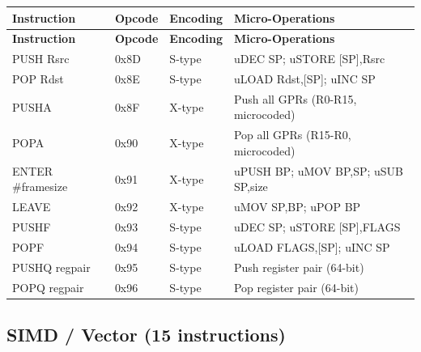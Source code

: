 \documentclass[12pt]{article}
\begin{document}
\begin{longtable}{@{}L{2.8cm}L{1.5cm}L{1.7cm}L{4.5cm}@{}}
\toprule
\textbf{Instruction} & \textbf{Opcode} & \textbf{Encoding} & \textbf{Micro-Operations} \\ \midrule
\endfirsthead
\toprule
\textbf{Instruction} & \textbf{Opcode} & \textbf{Encoding} & \textbf{Micro-Operations} \\ \midrule
\endhead
PUSH Rsrc & 0x8D & S-type & uDEC SP; uSTORE [SP],Rsrc \\
POP Rdst & 0x8E & S-type & uLOAD Rdst,[SP]; uINC SP \\
PUSHA & 0x8F & X-type & Push all GPRs (R0-R15, microcoded) \\
POPA & 0x90 & X-type & Pop all GPRs (R15-R0, microcoded) \\
ENTER \#framesize & 0x91 & X-type & uPUSH BP; uMOV BP,SP; uSUB SP,size \\
LEAVE & 0x92 & X-type & uMOV SP,BP; uPOP BP \\
PUSHF & 0x93 & S-type & uDEC SP; uSTORE [SP],FLAGS \\
POPF & 0x94 & S-type & uLOAD FLAGS,[SP]; uINC SP \\
PUSHQ regpair & 0x95 & S-type & Push register pair (64-bit) \\
POPQ regpair & 0x96 & S-type & Pop register pair (64-bit) \\ \bottomrule
\end{longtable}

\subsection{SIMD / Vector (15 instructions)}
\end{document}
